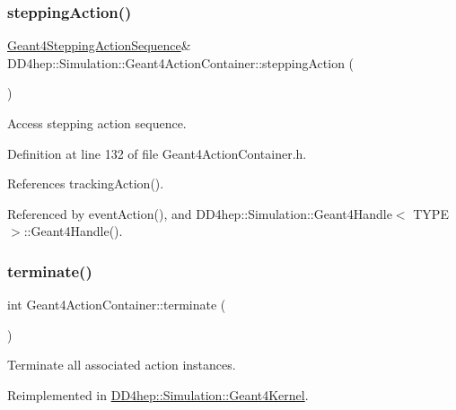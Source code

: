 \subsubsection{\texorpdfstring{stepping\+Action()}{steppingAction()}\hspace{0.1cm}{\footnotesize\ttfamily [2/2]}}
{\footnotesize\ttfamily \hyperlink{class_d_d4hep_1_1_simulation_1_1_geant4_stepping_action_sequence}{Geant4\+Stepping\+Action\+Sequence}\& D\+D4hep\+::\+Simulation\+::\+Geant4\+Action\+Container\+::stepping\+Action (\begin{DoxyParamCaption}{ }\end{DoxyParamCaption})\hspace{0.3cm}{\ttfamily [inline]}}



Access stepping action sequence. 



Definition at line 132 of file Geant4\+Action\+Container.\+h.



References tracking\+Action().



Referenced by event\+Action(), and D\+D4hep\+::\+Simulation\+::\+Geant4\+Handle$<$ T\+Y\+P\+E $>$\+::\+Geant4\+Handle().

\hypertarget{class_d_d4hep_1_1_simulation_1_1_geant4_action_container_ad9cfc3e1bc35d384f5dbd4e8747ddf69}{}\label{class_d_d4hep_1_1_simulation_1_1_geant4_action_container_ad9cfc3e1bc35d384f5dbd4e8747ddf69} 
\subsubsection{\texorpdfstring{terminate()}{terminate()}}
{\footnotesize\ttfamily int Geant4\+Action\+Container\+::terminate (\begin{DoxyParamCaption}{ }\end{DoxyParamCaption})\hspace{0.3cm}{\ttfamily [virtual]}}



Terminate all associated action instances. 



Reimplemented in \hyperlink{class_d_d4hep_1_1_simulation_1_1_geant4_kernel_ae73e828fed81e3343fe49f08701d3ac3}{D\+D4hep\+::\+Simulation\+::\+Geant4\+Kernel}.



